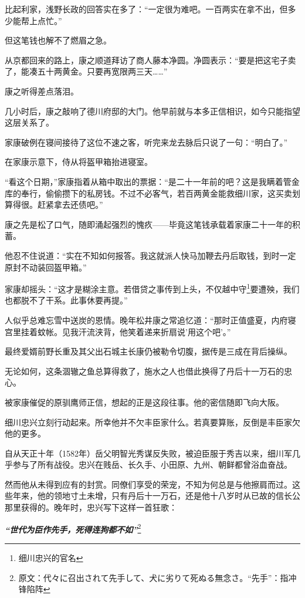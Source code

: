 \documentclass[
]{book}
\begin{document}
比起利家，浅野长政的回答实在多了：``一定很为难吧。一百两实在拿不出，但多少能帮上点忙。''

但这笔钱也解不了燃眉之急。

从京都回来的路上，康之顺道拜访了商人藤本净圆。净圆表示：``要是把这宅子卖了，能凑五十两黄金。只要再宽限两三天\ldots\ldots{}''

康之听得差点落泪。

几小时后，康之敲响了德川府邸的大门。他早前就与本多正信相识，如今只能指望这层关系了。

家康破例在寝间接待了这位不速之客，听完来龙去脉后只说了一句：``明白了。''

在家康示意下，侍从将盔甲箱抬进寝室。

``看这个日期，''家康指着从箱中取出的票据：``是二十一年前的吧？这是我瞒着管金库的奉行，偷偷攒下的私房钱。不过不必客气，若百两黄金能救细川家，这买卖划算得很。赶紧拿去还债吧。''

康之先是松了口气，随即涌起强烈的愧疚------毕竟这笔钱承载着家康二十一年的积蓄。

他忍不住说道：``实在不知如何报答。我这就派人快马加鞭去丹后取钱，到时一定原封不动装回盔甲箱。''

家康却摇头：``这才是糊涂主意。若借贷之事传到上头，不仅越中守\footnote{细川忠兴的官名}要遭殃，我们也都脱不了干系。此事休要再提。''

人似乎总难忘雪中送炭的恩情。晚年松井康之常追忆道：``那时正值盛夏，内府寝宫里挂着蚊帐。见我汗流浃背，他笑着递来折扇说'用这个吧'。''

最终爱婿前野长重及其父出石城主长康仍被勒令切腹，据传是三成在背后操纵。

无论如何，这条涸辙之鱼总算得救了，施水之人也借此换得了丹后十一万石的忠心。

被家康催促的原驯鹰师正信，想起的正是这段往事。他的密信随即飞向大阪。

细川忠兴立刻行动起来。所幸他并不欠丰臣家什么。若真要算账，反倒是丰臣家欠他的更多。

自从天正十年（1582年）岳父明智光秀谋反失败，被迫臣服于秀吉以来，细川军几乎参与了所有战役。忠兴在贱岳、长久手、小田原、九州、朝鲜都曾浴血奋战。

然而他从未得到应有的封赏。同僚们享受的荣宠，不知为何总是与他擦肩而过。这些年来，他的领地寸土未增，只有丹后十一万石，还是他十八岁时从已故的信长公那里获得的。晚年时，忠兴写下这样一首狂歌：

\textbf{\emph{``世代为臣作先手，死得连狗都不如''}}\footnote{原文：代々に召出されて先手して、犬に劣りて死ぬる無念さ。``先手''：指冲锋陷阵}
\end{document}
